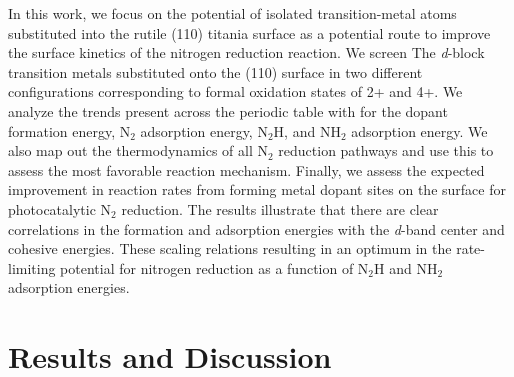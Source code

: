 In this work, we focus on the potential of isolated transition-metal atoms substituted into the rutile (110) titania surface as a potential route to improve the surface kinetics of the nitrogen reduction reaction. We screen The \textit{d}-block transition metals substituted onto the (110) surface in two different configurations corresponding to formal oxidation states of 2+ and 4+. 
We analyze the trends present across the periodic table with for the dopant formation energy, N$_2$ adsorption energy, N$_2$H, and NH$_2$ adsorption energy. We also map out the thermodynamics of all N$_2$ reduction pathways and use this to assess the most favorable reaction mechanism. Finally, we assess the expected improvement in reaction rates from forming metal dopant sites on the surface for photocatalytic N$_2$ reduction. The results illustrate that there are clear correlations in the formation and adsorption energies with the \textit{d}-band center and cohesive energies. These scaling relations resulting in an optimum in the rate-limiting potential for nitrogen reduction as a function of N$_2$H and NH$_2$ adsorption energies. %

\section{Results and Discussion}

